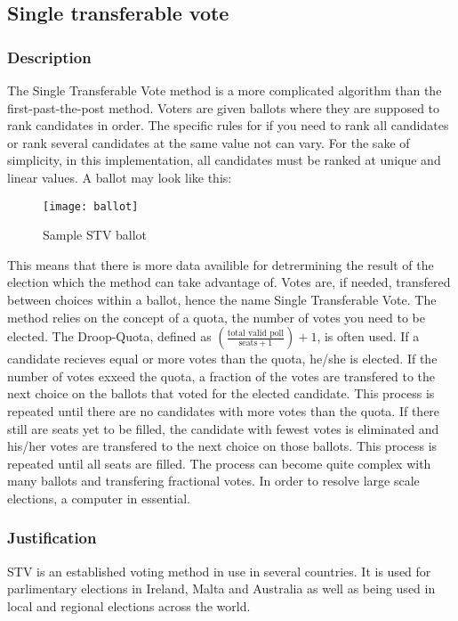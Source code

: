 \subsection{Single transferable vote}
\subsubsection{Description}
The Single Transferable Vote method is a more complicated algorithm than the first-past-the-post method. Voters are given ballots where they are supposed to rank candidates in order. The specific rules for if you need to rank all candidates or rank several candidates at the same value not can vary. For the sake of simplicity, in this implementation, all candidates must be ranked at unique and linear values. A ballot may look like this:
\begin{figure}[H]
	\centering
	\texttt{[image: ballot]}
	\caption{Sample STV ballot}
	\label{STV ballot}
\end{figure}
This means that there is more data availible for detrermining the result of the election which the method can take advantage of. Votes are, if needed, transfered between choices within a ballot, hence the name Single Transferable Vote. The method relies on the concept of a quota, the number of votes you need to be elected. The Droop-Quota, defined as $(\frac{\text{total valid poll}}{\text{seats} + 1})+1$, is often used. If a candidate recieves equal or more votes than the quota, he/she is elected. If the number of votes exxeed the quota, a fraction of the votes are transfered to the next choice on the ballots that voted for the elected candidate. This process is repeated until there are no candidates with more votes than the quota. If there still are seats yet to be filled, the candidate with fewest votes is eliminated and his/her votes are transfered to the next choice on those ballots. This process is repeated until all seats are filled. The process can become quite complex with many ballots and transfering fractional votes. In order to resolve large scale elections, a computer in essential.
\subsubsection{Justification}
STV is an established voting method in use in several countries. It is used for parlimentary elections in Ireland, Malta and Australia as well as being used in local and regional elections across the world.
